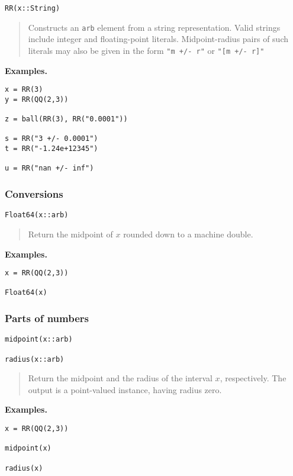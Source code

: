 \documentclass[a4paper,10pt]{article}
\newcommand{\code}{\lstinline}
\newcommand{\desc}[1]{\vspace{-3mm}\begin{quote}#1\end{quote}}
\begin{document}
{{\begin{lstlisting}
RR(x::String)
\end{lstlisting}

\desc{Constructs an \code{arb} element from a string representation.
Valid strings include integer and floating-point literals. Midpoint-radius
pairs of such literals may also be given in the form \code{"m +/- r"}
or \code{"[m +/- r]"}}

\textbf{Examples.}

\begin{lstlisting}
x = RR(3)
y = RR(QQ(2,3))

z = ball(RR(3), RR("0.0001"))

s = RR("3 +/- 0.0001")
t = RR("-1.24e+12345")

u = RR("nan +/- inf")
\end{lstlisting}

\subsubsection{Conversions}

\begin{lstlisting}
Float64(x::arb)
\end{lstlisting}

\desc{Return the midpoint of $x$ rounded down to a machine double.}

\textbf{Examples.}

\begin{lstlisting}
x = RR(QQ(2,3))

Float64(x)
\end{lstlisting}

\subsubsection{Parts of numbers}

\begin{lstlisting}
midpoint(x::arb)

radius(x::arb)
\end{lstlisting}

\desc{Return the midpoint and the radius of the interval $x$, respectively.
The output is a point-valued \text{arb} instance, having radius zero.}

\textbf{Examples.}

\begin{lstlisting}
x = RR(QQ(2,3))

midpoint(x)

radius(x)
\end{lstlisting}

}}
\end{document}
